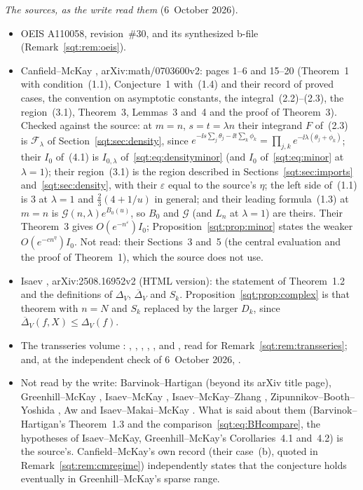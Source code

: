 \begin{writenote}
\emph{The sources, as the write read them} (6~October 2026).
\begin{itemize}\raggedright
\item OEIS A110058, revision~\#30, and its synthesized b-file
 (Remark~\ref{sqt:rem:oeis}).
\item Canfield--McKay \cite{CM}, arXiv:math/0703600v2: pages 1--6 and
 15--20 (Theorem~1 with condition~(1.1), Conjecture~1 with~(1.4) and their
 record of proved cases, the convention on asymptotic constants, the
 integral~(2.2)--(2.3), the region~(3.1), Theorem~3, Lemmas~3 and~4 and
 the proof of Theorem~3). Checked against the source: at $m=n$, $s=t=\lambda
 n$ their integrand $F$ of~(2.3) is $\mathcal F_\lambda$ of
 Section~\ref{sqt:sec:density}, since
 $e^{-\ii s\sum_j\theta_j-\ii t\sum_k\phi_k}=\prod_{j,k}e^{-\ii\lambda(\theta_j+\phi_k)}$;
 their $I_0$ of~(4.1) is $I_{0,\lambda}$ of~\eqref{sqt:eq:densityminor}
 (and $I_0$ of~\eqref{sqt:eq:minor} at $\lambda=1$); their region~(3.1) is
 the region described in Sections~\ref{sqt:sec:imports}
 and~\ref{sqt:sec:density}, with their $\varepsilon$ equal to the source's
 $\eta$; the left side of~(1.1) is $3$ at $\lambda=1$ and
 $\tfrac23(4+1/u)$ in general; and their leading formula~(1.3) at $m=n$ is
 $\mathcal G(n,\lambda)e^{B_0(u)}$, so $B_0$ and $\mathcal G$ (and $L_n$ at
 $\lambda=1$) are theirs. Their Theorem~3 gives $O(e^{-n^\varepsilon})I_0$;
 Proposition~\ref{sqt:prop:minor} states the weaker $O(e^{-cn^\eta})I_0$.
 Not read: their Sections~3 and~5 (the central evaluation and the proof of
 Theorem~1), which the source does not use.
\item Isaev \cite{Isaev}, arXiv:2508.16952v2 (HTML version): the statement
 of Theorem~1.2 and the definitions of $\Delta_V$, $\overline\Delta_V$ and
 $S_k$. Proposition~\ref{sqt:prop:complex} is that theorem with $n=N$ and
 $S_k$ replaced by the larger $D_k$, since
 $\overline\Delta_V(f,X)\le\Delta_V(f)$.
\item The transseries volume
 :
 , ,
 , ,
 ,  and
 , read for Remark~\ref{sqt:rem:transseries}; and,
 at the independent check of 6~October 2026,
 .
\item Not read by the write: Barvinok--Hartigan \cite{BH} (beyond its arXiv
 title page), Greenhill--McKay \cite{GM}, Isaev--McKay \cite{IM,IM2018},
 Isaev--McKay--Zhang \cite{IMZ}, Zipunnikov--Booth--Yoshida \cite{ZBY}, Aw
 \cite{Aw} and Isaev--Makai--McKay \cite{IMM}. What is said about them
 (Barvinok--Hartigan's Theorem~1.3 and the comparison~\eqref{sqt:eq:BHcompare},
 the hypotheses of Isaev--McKay, Greenhill--McKay's Corollaries~4.1
 and~4.2) is the source's. Canfield--McKay's own record (their case~(b),
 quoted in Remark~\ref{sqt:rem:cmregime}) independently states that the
 conjecture holds eventually in Greenhill--McKay's sparse range.
\end{itemize}


\end{writenote}
